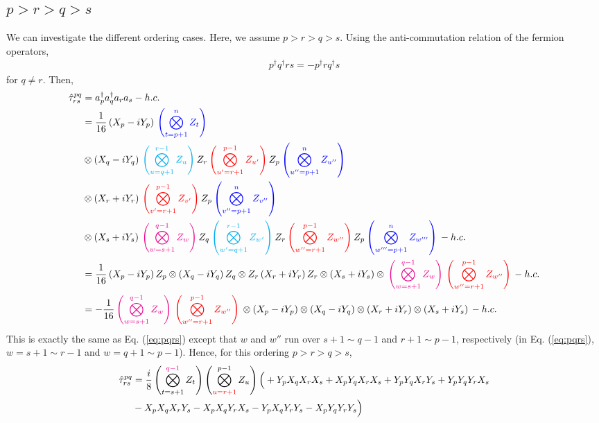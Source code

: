 \documentclass[prb,amsmath,amsfonts,amssymb]{revtex4}
\newcommand{\blue}{\color{blue}{}}
\newcommand{\red}{\color{red}{}}
\newcommand{\black}{\color{black}{}}
\newcommand{\cyan}{\color{cyan}{}}
\newcommand{\magenta}{\color{magenta}{}}
\begin{document}
\subsection{$p>r>q>s$}
We can investigate the different ordering cases. Here, we assume $p>r>q>s$. Using the anti-commutation relation of the fermion operators,
\begin{align}
	p^\dag q^\dag r s = -p^\dag r q^\dag s 
\end{align} 
for $q\ne r$. Then,
\begin{align}
	\hat \tau_{rs}^{pq} &= a_p^\dag a_q^\dag a_r a_s- h.c. \nonumber \\
	&=  \frac{1}{16}\left(X_p - i Y_p\right)\blue\left(\bigotimes_{t=p+1}^{n}Z_t \right)	\nonumber\\
	& \otimes
	 \left(X_q - i Y_q\right)
\cyan\left(\bigotimes_{u=q+1}^{r-1}Z_u \right)
\black Z_r
\red	 \left(\bigotimes_{u'=r+1}^{p-1}Z_{u'} \right)
\black	  Z_p
	   \blue\left(\bigotimes_{u''=p+1}^{n}Z_{u''} \right)\nonumber\\
	&\otimes
\left(X_r + i Y_r\right)
\red \left(\bigotimes_{v'=r+1}^{p-1}Z_{v'} \right)
\black Z_p
\blue\left(\bigotimes_{v''=p+1}^{n}Z_{v''} \right)
	\nonumber\\	
	&\otimes
\left(X_s + i Y_s\right)
\magenta \left(\bigotimes_{w=s+1}^{q-1} Z_w \right)
\black Z_q
\cyan \left(\bigotimes_{w'=q+1}^{r-1} Z_{w'} \right)
\black Z_r
\red \left(\bigotimes_{w''=r+1}^{p-1} Z_{w''} \right)
\black Z_p
\blue\left(\bigotimes_{w'''=p+1}^{n} Z_{w'''} \right)
\black 
- h.c.\nonumber\\
%
	&=  \frac{1}{16}\left(X_p - i Y_p\right) Z_p
 \otimes
	 \left(X_q - i Y_q\right)Z_q
\otimes
\black Z_r\left(X_r + i Y_r\right)\black Z_r
\otimes
\left(X_s + i Y_s\right)\otimes
\magenta \left(\bigotimes_{w=s+1}^{q-1} Z_w \right)
\red \left(\bigotimes_{w''=r+1}^{p-1} Z_{w''} \right)
\black 
- h.c.\nonumber\\
%
	&=  -\frac{1}{16}
	\magenta \left(\bigotimes_{w=s+1}^{q-1} Z_w \right)
\red \left(\bigotimes_{w''=r+1}^{p-1} Z_{w''} \right)\black
\otimes \left(X_p - i Y_p\right) 
 \otimes
	 \left(X_q - i Y_q\right)
\otimes
\left(X_r + i Y_r\right)
\otimes
\left(X_s + i Y_s\right)
\black 
- h.c.
\end{align}
This is exactly the same as Eq. (\ref{eq:pqrs}) except that $w$ and $w''$ run over $s+1\sim q-1$ and $r+1\sim p-1$, respectively (in Eq. (\ref{eq:pqrs}), $w = s+1 \sim r-1$ and $w = q+1 \sim p-1$). Hence, for this ordering $p > r > q > s$,
\begin{align}
		\hat \tau_{rs}^{pq} &= \frac{i }{8} \left(\bigotimes_{t=s+1}^{{\magenta q-1}} Z_t \right) \left(\bigotimes_{{\red u=r+1}}^{p-1} Z_{u} \right) 
 \Bigl(
\black +Y_p X_q X_r X_s 
\black  + X_p Y_q X_r X_s
\black + Y_p Y_q X_r  Y_s 
\black+ Y_p Y_q Y_r  X_s \\&
\black - X_p X_q X_r Y_s 
\black - X_p X_q Y_r X_s 
\black -Y_p  X_q  Y_r Y_s 
\black- X_p Y_q Y_r Y_s 
\black\Bigr) 
\end{align}
\end{document}
